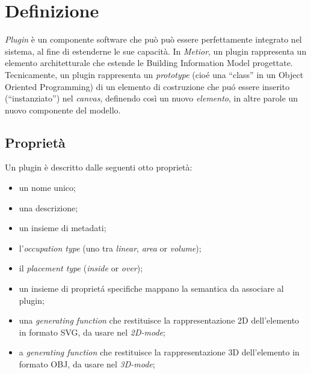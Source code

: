\section{Definizione}
\label{sec:chapter_3_section_1}

\emph{Plugin} \`e un componente software che pu\`o può essere perfettamente integrato nel sistema, al fine di estenderne le sue capacit\`a.
In \emph{Metior}, un plugin rappresenta un elemento architetturale che estende le Building Information Model progettate.
Tecnicamente, un plugin rappresenta un \emph{prototype} (cio\'e una ``class'' in un Object Oriented Programming) di un elemento di
costruzione che pu\'o essere inserito (``instanziato'') nel \emph{canvas}, definendo cos\`i un nuovo \emph{elemento}, in altre parole
un nuovo componente del modello.
\newpage


\subsection*{Proprietà}

\noindent
Un plugin \`e descritto dalle seguenti otto propriet\`a:
\begin{itemize}
  \item un nome unico;
  \item una descrizione;
  \item un insieme di metadati;
  \item l'\emph{occupation type} (uno tra \emph{linear}, \emph{area} or \emph{volume});
  \item il \emph{placement type} (\emph{inside} or \emph{over});
  \item un insieme di propriet\'a specifiche mappano la semantica da associare al plugin;
  \item  una \emph{generating function} che restituisce la rappresentazione 2D dell'elemento in formato SVG, da usare nel \emph{2D-mode};
  \item  a \emph{generating function} che restituisce la rappresentazione 3D dell'elemento in formato OBJ, da usare nel  \emph{3D-mode};
\end{itemize}

